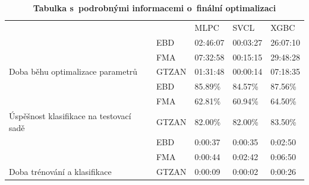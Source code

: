 \begin{table}[H]
	\vskip6pt
    \caption{\textbf{Tabulka s~podrobnými informacemi o~finální optimalizaci}}
    \label{tabulka_final_optimisation_info}  
    \vskip6pt
	\centering
    \begin{tabular}{lllll}
                                                              &                                                  & MLPC                             & SVCL                             & XGBC                             \\ \cline{3-5} 
                                                              & \multicolumn{1}{l|}{EBD}                         & 02:46:07                         & 00:03:27                         & 26:07:10                         \\
                                                              & \multicolumn{1}{l|}{\cellcolor[HTML]{EFEFEF}FMA} & \cellcolor[HTML]{EFEFEF}07:32:58 & \cellcolor[HTML]{EFEFEF}00:15:15 & \cellcolor[HTML]{EFEFEF}29:48:28 \\
    \multirow{-3}{*}{Doba běhu optimalizace parametrů}        & \multicolumn{1}{l|}{GTZAN}                       & 01:31:48                         & 00:00:14                         & 07:18:35                         \\ \hline
                                                              & \multicolumn{1}{l|}{EBD}                         & 85.89\%                          & 84.57\%                          & 87.56\%                          \\
                                                              & \multicolumn{1}{l|}{\cellcolor[HTML]{EFEFEF}FMA} & \cellcolor[HTML]{EFEFEF}62.81\%  & \cellcolor[HTML]{EFEFEF}60.94\%  & \cellcolor[HTML]{EFEFEF}64.50\%  \\
    \multirow{-3}{*}{Úspěšnost klasifikace na testovací sadě} & \multicolumn{1}{l|}{GTZAN}                       & 82.00\%                          & 82.00\%                          & 83.50\%                          \\ \hline
                                                              & \multicolumn{1}{l|}{EBD}                         & 0:00:37                          & 0:00:35                          & 0:02:50                          \\
                                                              & \multicolumn{1}{l|}{\cellcolor[HTML]{EFEFEF}FMA} & \cellcolor[HTML]{EFEFEF}0:00:44  & \cellcolor[HTML]{EFEFEF}0:02:42  & \cellcolor[HTML]{EFEFEF}0:06:50  \\
    \multirow{-3}{*}{Doba trénování a klasifikace}            & \multicolumn{1}{l|}{GTZAN}                       & 0:00:09                          & 0:00:02                          & 0:00:26                         
    \end{tabular}
\end{table}

